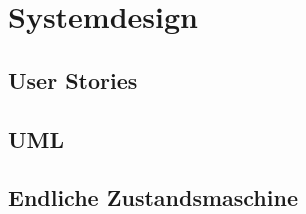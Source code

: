\chapter{Systemdesign}
\label{sec:design}

\section{User Stories}
\label{sec:design:user_stories}


\section{UML}
\label{sec:design:uml}


\section{Endliche Zustandsmaschine}
\label{sec:design:fsm}
